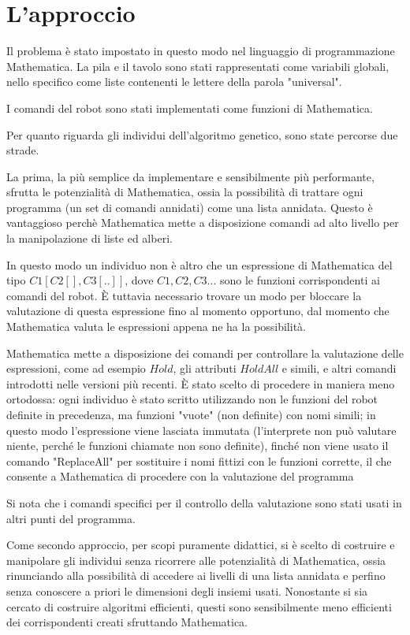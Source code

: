 \documentclass[paper=a4, fontsize=11pt]{scrartcl}
\numberwithin{equation}{section}		%
\numberwithin{figure}{section}			%
\numberwithin{table}{section}				%
\begin{document}
\section{L'approccio}
Il problema è stato impostato in questo modo nel linguaggio di programmazione Mathematica. La pila e il tavolo sono stati rappresentati come variabili globali, nello specifico come liste contenenti le lettere della parola "universal".

I comandi del robot sono stati implementati come funzioni di Mathematica. 

Per quanto riguarda gli individui dell'algoritmo genetico, sono state percorse due strade.

La prima, la più semplice da implementare e sensibilmente più performante, sfrutta le potenzialità di Mathematica, ossia la possibilità di trattare ogni programma (un set di comandi annidati) come una lista annidata. Questo è vantaggioso perchè Mathematica mette a disposizione comandi ad alto livello per la manipolazione di liste ed alberi.

In questo modo un individuo non è altro che un espressione di Mathematica del tipo $C1[C2[], C3[..]]$, dove $C1,C2,C3...$ sono le funzioni corrispondenti ai comandi del robot. È tuttavia necessario trovare un modo per bloccare la valutazione di questa espressione fino al momento opportuno, dal momento che Mathematica valuta le espressioni appena ne ha la possibilità.
  
Mathematica mette a disposizione dei comandi per controllare la valutazione delle espressioni, come ad esempio $Hold$, gli attributi $HoldAll$ e simili, e altri comandi introdotti nelle versioni più recenti. È stato scelto di procedere in maniera meno ortodossa: ogni individuo è stato scritto utilizzando non le funzioni del robot definite in precedenza, ma funzioni "vuote" (non definite) con nomi simili; in questo modo l'espressione viene lasciata immutata (l'interprete non può valutare niente, perché le funzioni chiamate non sono definite), finché non viene usato il comando "ReplaceAll" per sostituire i nomi fittizi con le funzioni corrette, il che consente a Mathematica di procedere con la valutazione del programma

Si nota che i comandi specifici per il controllo della valutazione sono stati usati in altri punti del programma.

Come secondo approccio, per scopi puramente didattici, si è scelto di costruire e manipolare gli individui senza ricorrere alle potenzialità di Mathematica, ossia rinunciando alla possibilità di accedere ai livelli di una lista annidata e perfino senza conoscere a priori le dimensioni degli insiemi usati. Nonostante si sia cercato di costruire algoritmi efficienti, questi sono sensibilmente meno efficienti dei corrispondenti creati sfruttando Mathematica.
\end{document}
